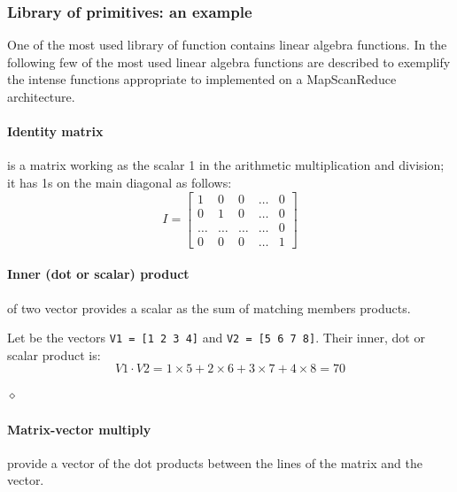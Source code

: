 \subsubsection{Library of primitives: an example}

One of the most used library of function contains linear algebra functions. In the following few of the most used linear algebra functions are described to exemplify the intense functions appropriate to implemented on a MapScanReduce architecture.

\paragraph{Identity matrix} is a matrix working as the scalar 1 in the arithmetic multiplication and division; it has 1s on the main diagonal as follows:
\[
I = \begin{bmatrix}
    1 & 0 & 0 & \ldots & 0 \\
    0 & 1 & 0 & \ldots & 0 \\
    \ldots & \ldots & \ldots & \ldots & 0               \\
    0 & 0 & 0 & \dots  & 1
    \end{bmatrix}
\]


\paragraph{Inner (dot or scalar) product} of two vector provides a scalar as the sum of matching members products.
\begin{exemplu} Let be the vectors {\tt V1 = [1 2 3 4]} and {\tt V2 = [5 6 7 8]}. Their inner, dot or scalar product is: $$V1 \cdot V2 = 1 \times 5 + 2 \times 6 + 3 \times 7 + 4 \times 8 = 70$$

$\diamond$
\end{exemplu}

\paragraph{Matrix-vector multiply} provide a vector of the dot products between the lines of the matrix and the vector.

